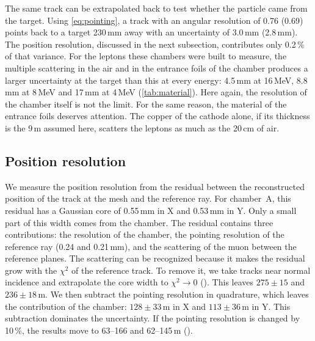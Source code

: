 The same track can be extrapolated back to test whether the particle came from the target. Using
\cref{eq:pointing}, a track with an angular resolution of 0.76\textdegree{} (0.69\textdegree) points back to a
target 230\,mm away with an uncertainty of 3.0\,mm (2.8\,mm). The position resolution, discussed in the next
subsection, contributes only 0.2\,\% of that variance. For the leptons these chambers were built to measure, the
multiple scattering in the air and in the entrance foils of the chamber produces a larger uncertainty at the target
than this at every energy: 4.5\,mm at 16\,MeV, 8.8\,mm at 8\,MeV and 17\,mm at 4\,MeV (\cref{tab:material}). Here
again, the resolution of the chamber itself is not the limit. For the same reason, the material of the entrance foils
deserves attention. The copper of the cathode alone, if its thickness is the 9\,\textmu m assumed here, scatters the
leptons as much as the 20\,cm of air.

\subsection{Position resolution}\label{sec:position}
We measure the position resolution from the residual between the reconstructed position of the track at the mesh
and the reference ray. For chamber~A, this residual has a Gaussian core of 0.55\,mm in X and 0.53\,mm in Y. Only a
small part of this width comes from the chamber. The residual contains three contributions: the resolution of the
chamber, the pointing resolution of the reference ray (0.24 and 0.21\,mm), and the scattering of the muon between the
reference planes. The scattering can be recognized because it makes the residual grow with the $\chi^2$ of the
reference track. To remove it, we take tracks near normal incidence and extrapolate the core width to $\chi^2\to0$
(). This leaves $275\pm15$ and $236\pm18$\,\textmu m. We then subtract the pointing resolution
in quadrature, which leaves the contribution of the chamber: $128\pm33$\,\textmu m in X and $113\pm36$\,\textmu m in
Y. This subtraction dominates the uncertainty. If the pointing resolution is changed by 10\,\%, the results move to
63--166 and 62--145\,\textmu m ().

